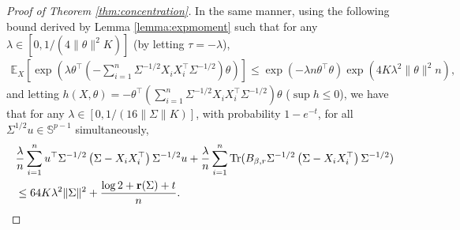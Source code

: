 \documentclass[11pt,a4paper]{article}
\theoremstyle{remark}
\theoremstyle{definition}
\newcommand{\bX}{X}
\newcommand{\bu}{u}
\newcommand{\btheta}{\theta}
\newcommand{\bfB}{B}
\newcommand{\bSigma}{\Sigma}
\newcommand{\bbS}{\mathbb{S}}
\newcommand{\E}{\mathbb{E}}
\newcommand{\tr}{\textnormal{Tr}}
\newcommand{\er}{\mathbf{r}}
\theoremstyle{definition}
\begin{document}
\begin{bibunit}[apalike]
\begin{proof}[Proof of Theorem \ref{thm:concentration}]
    In the same manner, using the following bound derived by Lemma \ref{lemma:expmoment} such that for any $\lambda\in[0,1/(4\|\btheta\|^{2}K)]$ (by letting $\tau=-\lambda$),
    \begin{align*}
        \E_{\bX}\left[\exp\left(\lambda\btheta^{\top} \left(-\sum_{i=1}^{n}\bSigma^{-1/2}\bX_{i}\bX_{i}^{\top}\bSigma^{-1/2}\right)\btheta\right)\right]\le \exp\left(-\lambda n\btheta^{\top}\btheta\right)\exp\left(4K\lambda^{2}\|\btheta\|^{2}n\right),
    \end{align*}
    and letting $h(\bX,\btheta)=-\btheta^{\top} (\sum_{i=1}^{n}\bSigma^{-1/2}\bX_{i}\bX_{i}^{\top}\bSigma^{-1/2})\btheta$ ($\sup h\le 0$),
    we have that for any $\lambda\in[0,1/(16\|\bSigma\|K)]$, with probability $1-e^{-t}$, for all $\bSigma^{1/2}\bu\in\bbS^{p-1}$ simultaneously,
    \begin{align*}
        &\frac{\lambda}{n}\sum_{i=1}^{n}\bu^{\top}\bSigma^{-1/2}\left(\bSigma-\bX_{i}\bX_{i}^{\top}\right)\bSigma^{-1/2}\bu+\frac{\lambda}{n}\sum_{i=1}^{n}\tr(\bfB_{\beta,r}\bSigma^{-1/2}\left(\bSigma-\bX_{i}\bX_{i}^{\top}\right)\bSigma^{-1/2})\\
        &\le 64K\lambda^{2}\|\bSigma\|^{2}+\frac{\log2+\er(\bSigma)+t}{n}.
    \end{align*}


\end{proof}
\end{bibunit}
\end{document}
